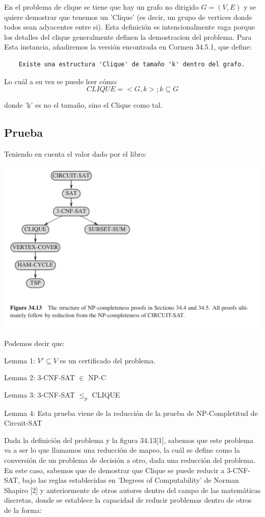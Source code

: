 \documentclass[a4paper]{article}
\begin{document}
En el problema de clique se tiene que hay un grafo no dirigido $ G = (V,E) $ y
se quiere demostrar que tenemos un 'Clique' (es decir, un grupo de vertices donde
todos sean adyacentes entre si). Esta definición es intencionalmente vaga porque 
los detalles del clique generalmente definen la demostracion del problema. Para Esta
instancia, añadiremos la versión encontrada en Cormen 34.5.1, que define:

\begin{verbatim}
    Existe una estructura 'Clique' de tamaño 'k' dentro del grafo.
\end{verbatim}
Lo cuál a su vez se puede leer cómo:
$$ CLIQUE = {<G,k>; k \subseteq G } $$

donde 'k' es no el tamaño, sino el Clique como tal.

\subsection{Prueba}

Teniendo en cuenta el valor dado por el libro:
\begin{center}
    \includegraphics[scale=0.8]{graph.png}
\end{center}

Podemos decir que:

\begin{center}

    Lemma 1: $ V' \subseteq V $ es un certificado del problema.

    Lemma 2: 3-CNF-SAT $ \in $ NP-C

    Lemma 3: 3-CNF-SAT $ \leq_p $ CLIQUE
    
    Lemma 4: Esta prueba viene de la reducción de la prueba de NP-Completitud
    de Circuit-SAT

\end{center}
Dada la definición del problema y la figura 34.13[1], sabemos que este problema va a
ser lo que llamamos una reducción de mapeo, la cuál se define como la conversión de un
problema de decisión a otro, dada una reducción del problema. En este caso, sabemos que
de demostrar que Clique se puede reducir a 3-CNF-SAT, bajo las reglas establecidas en 
'Degrees of Computability' de Norman Shapiro [2] y anteriormente de otros autores dentro
del campo de las matemáticas discretas, donde se establece la capacidad de reducir problemas
dentro de otros de la forma:
\end{document}
